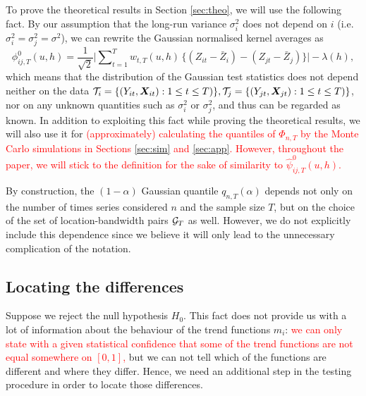 \documentclass[a4paper,12pt]{article}
\makeatletter
\renewcommand{\eqref}[1]{\tagform@{\ref{#1}}}
\makeatother
\begin{document}
\begin{remark}\label{rem:simpl}
To prove the theoretical results in Section \ref{sec:theo}, we will use the following fact. By our assumption that the long-run variance $\sigma_i^2$ does not depend on $i$ \linebreak (i.e. $\sigma_i^2 = \sigma^2_j = \sigma^2$), we can rewrite the Gaussian normalised kernel averages \eqref{eq:phi_zero_ij} as
\[\phi^0_{ij, T}(u, h) = \frac{1}{\sqrt{2}} \Big|\sum\nolimits_{t=1}^T w_{t,T}(u, h) \, \big\{ (Z_{it} - \bar{Z}_i) - (Z_{jt} - \bar{Z}_j) \big\}\Big| - \lambda(h), \] 
which means that the distribution of the Gaussian test statistics does not depend neither on the data $\mathcal{T}_i =\{ (Y_{it}, \boldsymbol{X}_{it}) : 1\leq t \leq T)\}, \mathcal{T}_j =\{ (Y_{jt}, \boldsymbol{X}_{jt}) : 1\leq t \leq T)\}$, nor on any unknown quantities such as $\sigma^2_i$ or $\sigma_j^2$, and thus can be regarded as known. In addition to exploiting this fact while proving the theoretical results, we will also use it for \textcolor{red}{(approximately) calculating the quantiles of $\Phi_{n, T}$ by the Monte Carlo simulations in Sections \ref{sec:sim} and \ref{sec:app}. However, throughout the paper, we will stick to the definition \eqref{eq:phi_zero_ij} for the sake of similarity to $\hat{\psi}^0_{ij, T}(u, h)$.}%
\end{remark}

\begin{remark}
By construction, the $(1-\alpha)$ Gaussian quantile $q_{n, T}(\alpha)$ depends not only on the number of times series considered $n$ and the sample size $T$, but on the choice of the set of location-bandwidth pairs $\mathcal{G}_T$ as well. However, we do not explicitly include this dependence since we believe it will only lead to the unnecessary complication of the notation. 
\end{remark}

\subsection{Locating the differences}\label{subsec:test:loc}

Suppose we reject the null hypothesis $H_0$. This fact does not provide us with a lot of information about the behaviour of the trend functions $m_i$: \textcolor{red}{we can only state with a given statistical confidence that some of the trend functions are not equal somewhere on $[0, 1]$,} but we can not tell which of the functions are different and where they differ. Hence, we need an additional step in the testing procedure in order to locate those differences.
\end{document}
